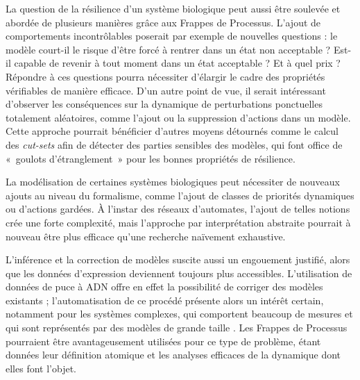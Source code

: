 
\myskip

La question de la résilience d'un système biologique peut aussi être soulevée
et abordée de plusieurs manières grâce aux Frappes de Processus.
L'ajout de comportements incontrôlables \cite{schwind13resilience}
poserait par exemple de nouvelles questions :
le modèle court-il le risque d'être forcé à rentrer dans un état non acceptable ?
Est-il capable de revenir à tout moment dans un état acceptable ?
Et à quel prix ?
Répondre à ces questions pourra nécessiter d'élargir le cadre des propriétés vérifiables
de manière efficace.
D'un autre point de vue, il serait intéressant d'observer les conséquences sur la dynamique
de perturbations ponctuelles totalement aléatoires, comme l'ajout ou la suppression d'actions
dans un modèle.
Cette approche pourrait bénéficier d'autres moyens détournés comme le calcul des
\textit{cut-sets} afin de détecter des parties sensibles des modèles,
qui font office de «~goulots d'étranglement~» pour les bonnes propriétés de résilience.

La modélisation de certaines systèmes biologiques peut nécessiter de nouveaux ajouts au niveau du
formalisme,
comme l'ajout de classes de priorités dynamiques ou d'actions gardées.
À l'instar des réseaux d'automates, l'ajout de telles notions crée une forte complexité,
mais l'approche par interprétation abstraite pourrait à nouveau être plus efficace
qu'une recherche naïvement exhaustive.

L'inférence et la correction de modèles suscite aussi un engouement justifié,
alors que les données d'expression deviennent toujours plus accessibles.
L'utilisation de données de puce à ADN offre en effet la possibilité de corriger des modèles
existants ; l'automatisation de ce procédé présente alors un intérêt certain,
notamment pour les systèmes complexes, qui comportent beaucoup de mesures
et qui sont représentés par des modèles de grande taille
.
Les Frappes de Processus pourraient être avantageusement utilisées pour ce type de problème,
étant données leur définition atomique et les analyses efficaces de la dynamique
dont elles font l'objet.




